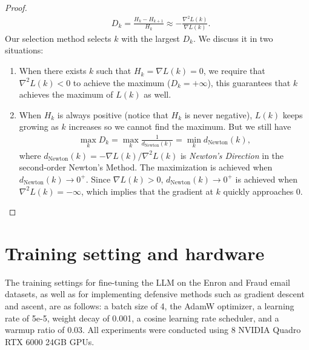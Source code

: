 \begin{proposition}
\begin{proof}
\begin{align}
    &D_k = \frac{H_k-H_{k+1}}{H_k} \approx -\frac{\nabla^2 L(k)}{\nabla L(k)}.
\end{align}
Our selection method selects $k$ with the largest $D_k$. We discuss it in two situations:
\begin{enumerate}
    \item When there exists $k$ such that $H_k=\nabla L(k)=0$, we require that $\nabla^2L(k)<0$ to achieve the maximum ($D_k=+\infty$), this guarantees that $k$ achieves the maximum of $L(k)$ as well.
    \item When $H_k$ is always positive (notice that $H_k$ is never negative), $L(k)$ keeps growing as $k$ increases so we cannot find the maximum. But we still have
    \begin{align}
        \max_k D_k = \max_k \frac{1}{d_{\text{Newton}}(k)}=\min_k d_{\text{Newton}}(k),
        \label{eq:newton_direction}
    \end{align}
    where $d_{\text{Newton}}(k)=-\nabla L(k)/\nabla^2L(k)$ is \textit{Newton's Direction} in the second-order Newton's Method. The maximization is achieved when $d_{\text{Newton}}(k)\rightarrow 0^+$. Since $\nabla L(k)> 0$, $d_{\text{Newton}}(k)\rightarrow 0^+$ is achieved when $\nabla^2 L(k)=-\infty$, which implies that the gradient at $k$ quickly approaches $0$. 
\end{enumerate}
\end{proof}
\end{proposition}

\section{Training setting and hardware\label{training_setting}}
The training settings for fine-tuning the LLM on the Enron and Fraud email datasets, as well as for implementing defensive methods such as gradient descent and ascent, are as follows: a batch size of 4, the AdamW optimizer, a learning rate of 5e-5, weight decay of 0.001, a cosine learning rate scheduler, and a warmup ratio of 0.03. All experiments were conducted using 8 NVIDIA Quadro RTX 6000 24GB GPUs.

